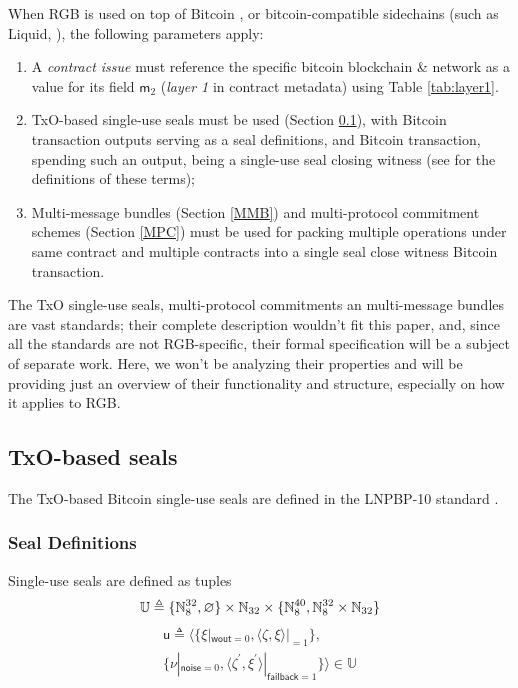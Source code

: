 \documentclass[9pt,oneside]{amsart}
\begin{document}
\begin{multicols}{2}
When RGB is used on top of Bitcoin \cite{Bitcoin},
or bitcoin-compatible sidechains (such as Liquid, \cite{Liquid}),
the following parameters apply:

\begin{enumerate}
\item A \emph{contract issue} must reference the specific bitcoin blockchain \& network
  as a value for its field $\mathsf{m}_2$ (\emph{layer 1} in contract metadata)
  using Table \ref{tab:layer1}.
\item TxO-based single-use seals must be used (Section \ref{Seals}),
  with Bitcoin transaction outputs serving as a seal definitions,
  and Bitcoin transaction, spending such an output, being a single-use seal closing witness
  (see \cite{LNPBP8} for the definitions of these terms);
\item Multi-message bundles (Section \ref{MMB})
  and multi-protocol commitment schemes (Section \ref{MPC}) must be used for packing
  multiple operations under same contract and multiple contracts
  into a single \gls{seal close witness} Bitcoin transaction.
\end{enumerate}

The TxO single-use seals, multi-protocol commitments an multi-message bundles are vast standards;
their complete description wouldn't fit this paper, and,
since all the standards are not RGB-specific,
their formal specification will be a subject of separate work.
Here, we won't be analyzing their properties and will be providing just an overview
of their functionality and structure, especially on how it applies to RGB.

\subsection{TxO-based seals}\label{Seals}

The TxO-based Bitcoin single-use seals are defined in the LNPBP-10 standard \cite{LNPBP10}.

\subsubsection{Seal Definitions}

Single-use seals are defined as tuples
\noindent
\begin{equation}
    \mathbb{U} \triangleq \{ \mathbb{N}_8^{32}, \varnothing \} \times \mathbb{N}_{32} \times \{ \mathbb{N}_8^{40}, \mathbb{N}_8^{32} \times \mathbb{N}_{32} \} \\
\end{equation}
\begin{multline}
    \mathsf{u} \triangleq \big\langle \{\xi|_{\mathsf{wout}=0}, \langle \zeta, \xi\rangle|_{=1} \}, \\
        \{\nu|_{\mathsf{noise}=0}, \langle \zeta^\prime, \xi^\prime\rangle|_{\mathsf{failback}=1} \} \big\rangle \in \mathbb{U}
\end{multline}


\end{multicols}
\end{document}
